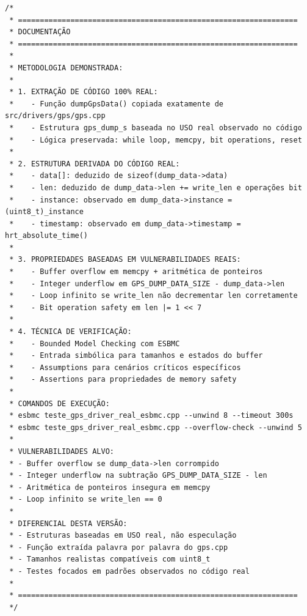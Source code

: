 \begin{lstlisting}
/* 
 * ================================================================
 * DOCUMENTAÇÃO
 * ================================================================
 * 
 * METODOLOGIA DEMONSTRADA:
 * 
 * 1. EXTRAÇÃO DE CÓDIGO 100% REAL:
 *    - Função dumpGpsData() copiada exatamente de src/drivers/gps/gps.cpp
 *    - Estrutura gps_dump_s baseada no USO real observado no código
 *    - Lógica preservada: while loop, memcpy, bit operations, reset
 * 
 * 2. ESTRUTURA DERIVADA DO CÓDIGO REAL:
 *    - data[]: deduzido de sizeof(dump_data->data) 
 *    - len: deduzido de dump_data->len += write_len e operações bit
 *    - instance: observado em dump_data->instance = (uint8_t)_instance
 *    - timestamp: observado em dump_data->timestamp = hrt_absolute_time()
 * 
 * 3. PROPRIEDADES BASEADAS EM VULNERABILIDADES REAIS:
 *    - Buffer overflow em memcpy + aritmética de ponteiros
 *    - Integer underflow em GPS_DUMP_DATA_SIZE - dump_data->len
 *    - Loop infinito se write_len não decrementar len corretamente
 *    - Bit operation safety em len |= 1 << 7
 * 
 * 4. TÉCNICA DE VERIFICAÇÃO:
 *    - Bounded Model Checking com ESBMC
 *    - Entrada simbólica para tamanhos e estados do buffer
 *    - Assumptions para cenários críticos específicos
 *    - Assertions para propriedades de memory safety
 * 
 * COMANDOS DE EXECUÇÃO:
 * esbmc teste_gps_driver_real_esbmc.cpp --unwind 8 --timeout 300s
 * esbmc teste_gps_driver_real_esbmc.cpp --overflow-check --unwind 5
 * 
 * VULNERABILIDADES ALVO:
 * - Buffer overflow se dump_data->len corrompido
 * - Integer underflow na subtração GPS_DUMP_DATA_SIZE - len
 * - Aritmética de ponteiros insegura em memcpy
 * - Loop infinito se write_len == 0
 * 
 * DIFERENCIAL DESTA VERSÃO:
 * - Estruturas baseadas em USO real, não especulação
 * - Função extraída palavra por palavra do gps.cpp
 * - Tamanhos realistas compatíveis com uint8_t
 * - Testes focados em padrões observados no código real
 * 
 * ================================================================
 */
\end{lstlisting}



